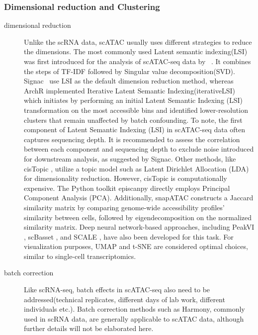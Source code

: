 \subsubsection{Dimensional reduction and Clustering}
\begin{description}
	\item[dimensional reduction] 
	Unlike the scRNA data, scATAC usually uses different strategies to reduce the dimensions. The most commonly used Latent semantic indexing(LSI) was first introduced for the analysis of scATAC-seq data by ~\citep{cusanovich2015multiplex}. It combines the steps of TF-IDF followed by Singular value decomposition(SVD). Signac~\citep{signac} use LSI as the default dimension reduction method, whereas ArchR implemented Iterative Latent Semantic Indexing(iterativeLSI)~\citep{satpathy2019massively, granja2019single} which initiates by performing an initial Latent Semantic Indexing (LSI) transformation on the most accessible bins and identified lower-resolution clusters that remain unaffected by batch confounding. To note, the first component of Latent Semantic Indexing (LSI) in scATAC-seq data often captures sequencing depth. It is recommended to assess the correlation between each component and sequencing depth to exclude noise introduced for downstream analysis, as suggested by Signac\citep{signac}. Other methods, like cisTopic \citep{bravo2019cistopic}, utilize a topic model such as Latent Dirichlet Allocation (LDA) for dimensionality reduction. However, cisTopic is computationally expensive. The Python toolkit episcanpy \citep{Danese2021episcanpy} directly employs Principal Component Analysis (PCA). Additionally, snapATAC \citep{fang2021snapatac} constructs a Jaccard similarity matrix by comparing genome-wide accessibility profiles' similarity between cells, followed by eigendecomposition on the normalized similarity matrix. Deep neural network-based approaches, including PeakVI \citep{ashuach2022peakvi}, scBasset \citep{yuan2022scbasset}, and SCALE \citep{xiong2019scale}, have also been developed for this task. For visualization purposes, UMAP and t-SNE are considered optimal choices, similar to single-cell transcriptomics. 
	
	\item[batch correction]
	Like scRNA-seq, batch effects in scATAC-seq also need to be addressed(technical replicates, different days of lab work, different individuals etc.). Batch correction methods such as Harmony\citep{korsunsky2019harmony}, commonly used in scRNA data, are generally applicable to scATAC data, although further details will not be elaborated here.
	

\end{description}
